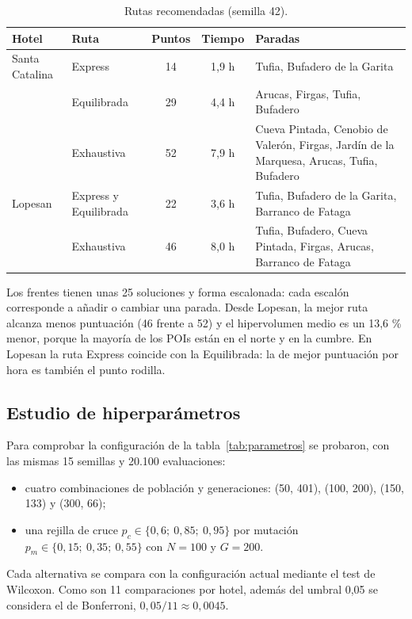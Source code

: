 \begin{table}[H]
\centering
\small
\caption{Rutas recomendadas (semilla 42).}
\label{tab:rutas}
\begin{tabularx}{\textwidth}{@{}l l c c X@{}}
\toprule
Hotel & Ruta & Puntos & Tiempo & Paradas \\
\midrule
Santa Catalina & Express & 14 & 1,9 h & Tufia, Bufadero de la Garita \\
 & Equilibrada & 29 & 4,4 h & Arucas, Firgas, Tufia, Bufadero \\
 & Exhaustiva & 52 & 7,9 h & Cueva Pintada, Cenobio de Valerón, Firgas, Jardín de la Marquesa, Arucas, Tufia, Bufadero \\
\midrule
Lopesan & Express y Equilibrada & 22 & 3,6 h & Tufia, Bufadero de la Garita, Barranco de Fataga \\
 & Exhaustiva & 46 & 8,0 h & Tufia, Bufadero, Cueva Pintada, Firgas, Arucas, Barranco de Fataga \\
\bottomrule
\end{tabularx}
\end{table}

Los frentes tienen unas 25 soluciones y forma escalonada: cada escalón corresponde a añadir o cambiar una parada. Desde Lopesan, la mejor ruta alcanza menos puntuación (46 frente a 52) y el hipervolumen medio es un 13,6 \% menor, porque la mayoría de los POIs están en el norte y en la cumbre. En Lopesan la ruta Express coincide con la Equilibrada: la de mejor puntuación por hora es también el punto rodilla.

\subsection{Estudio de hiperparámetros}
\label{sec:hiperparametros}

Para comprobar la configuración de la tabla~\ref{tab:parametros} se probaron, con las mismas 15 semillas y 20.100 evaluaciones:
\begin{itemize}
  \item cuatro combinaciones de población y generaciones: (50, 401), (100, 200), (150, 133) y (300, 66);
  \item una rejilla de cruce $p_c \in \{0{,}6;\ 0{,}85;\ 0{,}95\}$ por mutación $p_m \in \{0{,}15;\ 0{,}35;\ 0{,}55\}$ con $N = 100$ y $G = 200$.
\end{itemize}
Cada alternativa se compara con la configuración actual mediante el test de Wilcoxon. Como son 11 comparaciones por hotel, además del umbral 0,05 se considera el de Bonferroni, $0{,}05/11 \approx 0{,}0045$.

